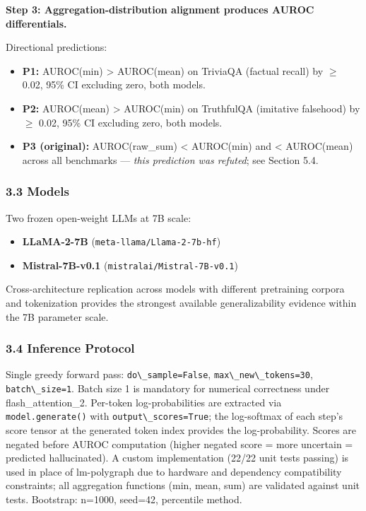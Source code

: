 \textbf{Step 3: Aggregation-distribution alignment produces AUROC differentials.}

Directional predictions:
\begin{itemize}
\item \textbf{P1:} AUROC(min) > AUROC(mean) on TriviaQA (factual recall) by $\geq$ 0.02, 95\% CI excluding zero, both models.
\item \textbf{P2:} AUROC(mean) > AUROC(min) on TruthfulQA (imitative falsehood) by $\geq$ 0.02, 95\% CI excluding zero, both models.
\item \textbf{P3 (original):} AUROC(raw\_sum) < AUROC(min) and < AUROC(mean) across all benchmarks --- \textit{this prediction was refuted}; see Section 5.4.
\end{itemize}

\subsubsection{3.3 Models}

Two frozen open-weight LLMs at 7B scale:
\begin{itemize}
\item \textbf{LLaMA-2-7B} (\texttt{meta-llama/Llama-2-7b-hf})
\item \textbf{Mistral-7B-v0.1} (\texttt{mistralai/Mistral-7B-v0.1})
\end{itemize}

Cross-architecture replication across models with different pretraining corpora and tokenization provides the strongest available generalizability evidence within the 7B parameter scale.

\subsubsection{3.4 Inference Protocol}

Single greedy forward pass: \texttt{do\textbackslash \_sample=False}, \texttt{max\textbackslash \_new\textbackslash \_tokens=30}, \texttt{batch\textbackslash \_size=1}. Batch size 1 is mandatory for numerical correctness under flash\_attention\_2. Per-token log-probabilities are extracted via \texttt{model.generate()} with \texttt{output\textbackslash \_scores=True}; the log-softmax of each step's score tensor at the generated token index provides the log-probability. Scores are negated before AUROC computation (higher negated score = more uncertain = predicted hallucinated). A custom implementation (22/22 unit tests passing) is used in place of lm-polygraph due to hardware and dependency compatibility constraints; all aggregation functions (min, mean, sum) are validated against unit tests. Bootstrap: n=1000, seed=42, percentile method.

